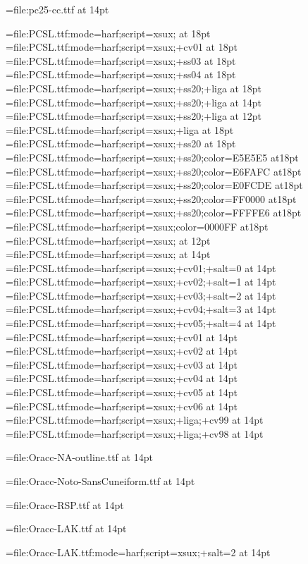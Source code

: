 \font\pccc={file:pc25-cc.ttf} at 14pt

\font\pcxxv={file:PCSL.ttf:mode=harf;script=xsux;} at 18pt
\font\pccvi={file:PCSL.ttf:mode=harf;script=xsux;+cv01} at 18pt
\font\pcssiii={file:PCSL.ttf:mode=harf;script=xsux;+ss03} at 18pt
\font\pcssiv={file:PCSL.ttf:mode=harf;script=xsux;+ss04} at 18pt
\font\pcssXX={file:PCSL.ttf:mode=harf;script=xsux;+ss20;+liga} at 18pt
\font\pcssxx={file:PCSL.ttf:mode=harf;script=xsux;+ss20;+liga} at 14pt
\font\pcssxxx={file:PCSL.ttf:mode=harf;script=xsux;+ss20;+liga} at 12pt
\font\pcxviii={file:PCSL.ttf:mode=harf;script=xsux;+liga} at 18pt
\font\pcssxx={file:PCSL.ttf:mode=harf;script=xsux;+ss20} at 18pt
\font\pceee={file:PCSL.ttf:mode=harf;script=xsux;+ss20;color=E5E5E5} at18pt
\font\pceff={file:PCSL.ttf:mode=harf;script=xsux;+ss20;color=E6FAFC} at18pt
\font\pcefd={file:PCSL.ttf:mode=harf;script=xsux;+ss20;color=E0FCDE} at18pt
\font\pcfee={file:PCSL.ttf:mode=harf;script=xsux;+ss20;color=FF0000} at18pt
\font\pcffe={file:PCSL.ttf:mode=harf;script=xsux;+ss20;color=FFFFE6} at18pt
\font\pcblu={file:PCSL.ttf:mode=harf;script=xsux;color=0000FF} at18pt
\font\pcringop={file:PCSL.ttf:mode=harf;script=xsux;} at 12pt
\font\pcseq={file:PCSL.ttf:mode=harf;script=xsux;} at 14pt
\font\pcseqi={file:PCSL.ttf:mode=harf;script=xsux;+cv01;+salt=0} at 14pt
\font\pcseqii={file:PCSL.ttf:mode=harf;script=xsux;+cv02;+salt=1} at 14pt
\font\pcseqiii={file:PCSL.ttf:mode=harf;script=xsux;+cv03;+salt=2} at 14pt
\font\pcseqiv={file:PCSL.ttf:mode=harf;script=xsux;+cv04;+salt=3} at 14pt
\font\pcseqv={file:PCSL.ttf:mode=harf;script=xsux;+cv05;+salt=4} at 14pt
\font\pccvi={file:PCSL.ttf:mode=harf;script=xsux;+cv01} at 14pt
\font\pccvii={file:PCSL.ttf:mode=harf;script=xsux;+cv02} at 14pt
\font\pccviii={file:PCSL.ttf:mode=harf;script=xsux;+cv03} at 14pt
\font\pccviv={file:PCSL.ttf:mode=harf;script=xsux;+cv04} at 14pt
\font\pccvv={file:PCSL.ttf:mode=harf;script=xsux;+cv05} at 14pt
\font\pccvvi={file:PCSL.ttf:mode=harf;script=xsux;+cv06} at 14pt
\font\pccvxcix={file:PCSL.ttf:mode=harf;script=xsux;+liga;+cv99} at 14pt
\font\pccvxcviii={file:PCSL.ttf:mode=harf;script=xsux;+liga;+cv98} at 14pt

\font\oraccnao={file:Oracc-NA-outline.ttf} at 14pt

\font\oraccnoto={file:Oracc-Noto-SansCuneiform.ttf} at 14pt

\font\oraccrsp={file:Oracc-RSP.ttf} at 14pt

\font\oracclak={file:Oracc-LAK.ttf} at 14pt

\font\oracclaksaltiii={file:Oracc-LAK.ttf:mode=harf;script=xsux;+salt=2} at 14pt

\endinput
